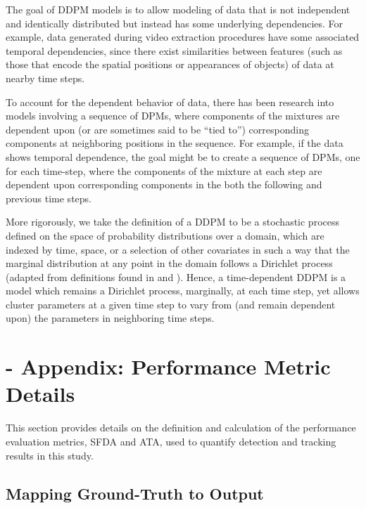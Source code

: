 \documentclass[twocolumn, final]{svjour3}
\begin{document}
The goal of DDPM models is to allow modeling of data that is not independent and identically distributed but instead has some underlying dependencies. For example, data generated during video extraction procedures have some associated temporal dependencies, since there exist similarities between features (such as those that encode the spatial positions or appearances of objects) of data at nearby time steps.

To account for the dependent behavior of data, there has been research into models involving a sequence of DPMs, where components of the mixtures are dependent upon (or are sometimes said to be ``tied to'') corresponding components at neighboring positions in the sequence. For example, if the data shows temporal dependence, the goal might be to create a sequence of DPMs, one for each time-step, where the components of the mixture at each step are dependent upon corresponding components in the both the following and previous time steps.

More rigorously, we take the definition of a DDPM to be a stochastic process defined on the space of probability distributions over a domain, which are indexed by time, space, or a selection of other covariates in such a way that the marginal distribution at any point in the domain follows a Dirichlet process (adapted from definitions found in \cite{gasthaus_thesis} and \cite{griffin2006order}). Hence, a time-dependent DDPM is a model which remains a Dirichlet process, marginally, at each time step, yet allows cluster parameters at a given time step to vary from (and remain dependent upon) the parameters in neighboring time steps.


\section{-  Appendix: Performance Metric Details}
\label{sec:performancemetricdetails}
This section provides details on the definition and calculation of the performance evaluation metrics, SFDA and ATA, used to quantify detection and tracking results in this study.

\subsection{Mapping Ground-Truth to Output}
\label{sec:mappingtoground}
\end{document}
